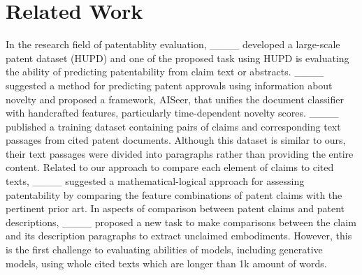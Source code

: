 \section{Related Work}
In the research field of patentablity evaluation, ____ developed a large-scale patent dataset (HUPD) and one of the proposed task using HUPD is evaluating the ability of predicting patentability from claim text or abstracts. ____ suggested a method for predicting patent approvals using information about novelty and proposed a framework, AISeer, that unifies the document classifier with handcrafted features, particularly time-dependent novelty scores. ____ published a training dataset containing pairs of claims and corresponding text passages from cited patent documents. Although this dataset is similar to ours, their text passages were divided into paragraphs rather than providing the entire content. Related to our approach to compare each element of claims to cited texts, ____ suggested a mathematical-logical approach for assessing patentability by comparing the feature combinations of patent claims with the pertinent prior art. In aspects of comparison between patent claims and patent descriptions, ____ proposed a new task to make comparisons between the claim and its description paragraphs to extract unclaimed embodiments. However, this is the first challenge to evaluating abilities of models, including generative models, using whole cited texts which are longer than 1k amount of words.